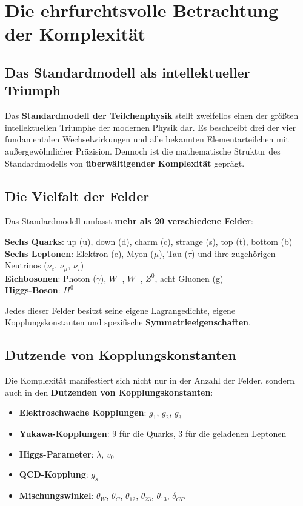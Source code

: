 \documentclass[12pt,a4paper]{report}
\begin{document}
	\section{Die ehrfurchtsvolle Betrachtung der Komplexität}
	
	\subsection{Das Standardmodell als intellektueller Triumph}
	
	Das \textbf{Standardmodell der Teilchenphysik} stellt zweifellos einen der größten intellektuellen Triumphe der modernen Physik dar. Es beschreibt drei der vier fundamentalen Wechselwirkungen und alle bekannten Elementarteilchen mit außergewöhnlicher Präzision. Dennoch ist die mathematische Struktur des Standardmodells von \textbf{überwältigender Komplexität} geprägt.
	
	\subsection{Die Vielfalt der Felder}
	
	Das Standardmodell umfasst \textbf{mehr als 20 verschiedene Felder}:
	
	\textbf{Sechs Quarks}: up (u), down (d), charm (c), strange (s), top (t), bottom (b)\\
	\textbf{Sechs Leptonen}: Elektron (e), Myon ($\mu$), Tau ($\tau$) und ihre zugehörigen Neutrinos ($\nu_e$, $\nu_\mu$, $\nu_\tau$)\\
	\textbf{Eichbosonen}: Photon ($\gamma$), $W^+$, $W^-$, $Z^0$, acht Gluonen (g)\\
	\textbf{Higgs-Boson}: $H^0$
	
	Jedes dieser Felder besitzt seine eigene Lagrangedichte, eigene Kopplungskonstanten und spezifische \textbf{Symmetrieeigenschaften}.
	
	\subsection{Dutzende von Kopplungskonstanten}
	
	Die Komplexität manifestiert sich nicht nur in der Anzahl der Felder, sondern auch in den \textbf{Dutzenden von Kopplungskonstanten}:
	
	\begin{itemize}
		\item \textbf{Elektroschwache Kopplungen}: $g_1$, $g_2$, $g_3$
		\item \textbf{Yukawa-Kopplungen}: 9 für die Quarks, 3 für die geladenen Leptonen
		\item \textbf{Higgs-Parameter}: $\lambda$, $v_0$
		\item \textbf{QCD-Kopplung}: $g_s$
		\item \textbf{Mischungswinkel}: $\theta_W$, $\theta_C$, $\theta_{12}$, $\theta_{23}$, $\theta_{13}$, $\delta_{CP}$
	\end{itemize}
	
\end{document}
